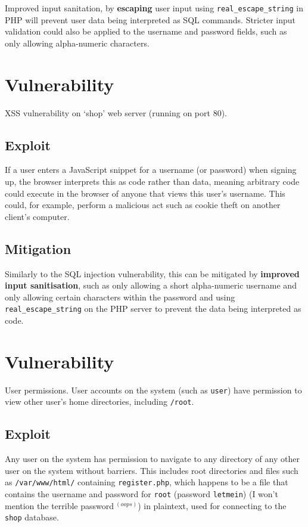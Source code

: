 \documentclass[11pt]{article}
\begin{document}
Improved input sanitation, by \textbf{escaping} user input using \texttt{real\_escape\_string} in PHP will prevent user data being interpreted as SQL commands. Stricter input validation could also be applied to the username and password fields, such as only allowing alpha-numeric characters.

\section{Vulnerability}

XSS vulnerability on `shop' web server (running on port 80).

\subsection{Exploit}

If a user enters a JavaScript snippet for a username (or password) when signing up, the browser interprets this as code rather than data, meaning arbitrary code could execute in the browser of anyone that views this user's username. This could, for example, perform a malicious act such as cookie theft on another client's computer.

\subsection{Mitigation}

Similarly to the SQL injection vulnerability, this can be mitigated by \textbf{improved input sanitisation}, such as only allowing a short alpha-numeric username and only allowing certain characters within the password and using \texttt{real\_escape\_string} on the PHP server to prevent the data being interpreted as code.

\section{Vulnerability}

User permissions. User accounts on the system (such as \texttt{user}) have permission to view other user's home directories, including \texttt{/root}.

\subsection{Exploit}

Any user on the system has permission to navigate to any directory of any other user on the system without barriers. This includes root directories and files such as \texttt{/var/www/html/} containing \texttt{register.php}, which happens to be a file that contains the username and password for \texttt{root} (password \texttt{letmein}) (I won't mention the terrible password$\:^{(oops)}$) in plaintext, used for connecting to the \texttt{shop} database.
\end{document}
